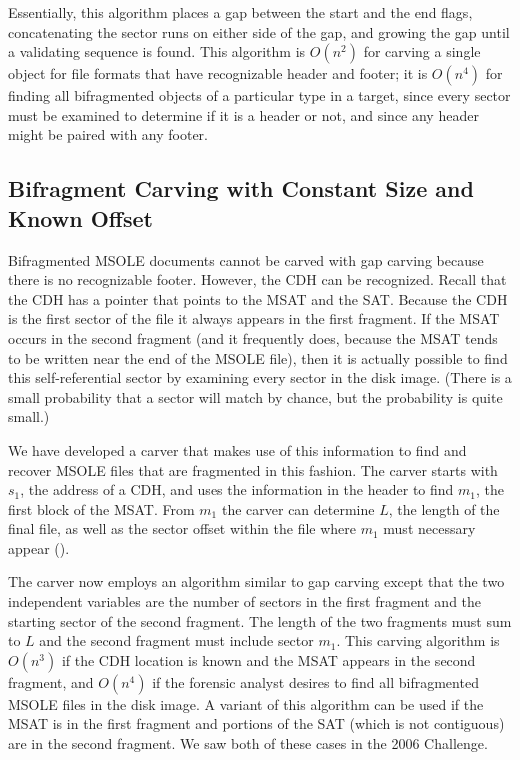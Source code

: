 \documentclass[11pt,letter]{article}
\begin{document}
Essentially, this algorithm places a gap between the start and the end
flags, concatenating the sector runs on either side of the gap, and
growing the gap until a validating sequence is found. This algorithm
is $O(n^2)$ for carving a single object for file formats that have
recognizable header and footer; it is $O(n^4)$ for finding all
bifragmented objects of a particular type in a target, since every
sector must be examined to determine if it is a header or not, and
since any header might be paired with any footer.

\subsection{Bifragment Carving with Constant Size and Known Offset}

Bifragmented MSOLE documents cannot be carved with gap carving because there is no
recognizable footer. However, the CDH can be recognized. 
Recall that the CDH has a pointer that points to
the MSAT and the SAT. Because the CDH is the first sector of the file
it always appears in the first fragment. If the MSAT occurs in the
second fragment (and it frequently does, because the MSAT tends to be
written near the end of the MSOLE file), then it is actually possible
to find this self-referential sector by examining every sector in the
disk image. (There is a small probability that a sector will
match by chance, but the probability is quite small.)

We have developed a carver that makes use of this information to find
and recover MSOLE files that are fragmented in this fashion. The
carver starts with $s_1$, the address of a CDH, and uses the
information in the header to find $m_1$, the first block of the
MSAT. From $m_1$ the carver can determine $L$, the length of the final
file, as well as the sector offset within the file where $m_1$ must
necessary appear ().

The carver now employs an algorithm similar to gap carving except that
the two independent variables are the number of sectors in the first
fragment and the starting sector of the second fragment. The length of
the two fragments must sum to $L$ and the second fragment must include
sector $m_1$. This carving algorithm is $O(n^3)$ if the CDH location
is known and the MSAT appears in the second fragment, and $O(n^4)$ if
the forensic analyst desires to find all bifragmented MSOLE files in
the disk image. A variant of this algorithm can be used if the MSAT is
in the first fragment and portions of the SAT (which is not
contiguous) are in the second fragment. We saw both of these cases in
the 2006 Challenge.
\end{document}
